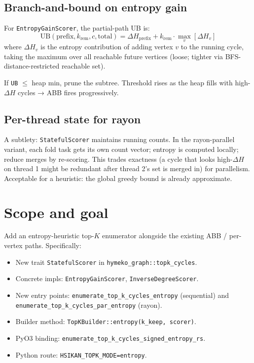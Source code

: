 \documentclass[a4paper,11pt]{article}
\begin{document}
\subsection*{Branch-and-bound on entropy gain}

For \texttt{EntropyGainScorer}, the partial-path UB is:
\[
  \mathrm{UB}(\text{prefix}, k_{\text{rem}}, c, \text{total}) =
  \Delta H_{\text{prefix}} + k_{\text{rem}} \cdot \max_v
  \left[\Delta H_v\right]
\]
where $\Delta H_v$ is the entropy contribution of adding vertex $v$
to the running cycle, taking the maximum over all reachable future
vertices (loose; tighter via BFS-distance-restricted reachable set).

If \texttt{UB} $\le$ heap min, prune the subtree.  Threshold rises
as the heap fills with high-$\Delta H$ cycles → ABB fires
progressively.

\subsection*{Per-thread state for rayon}

A subtlety: \texttt{StatefulScorer} maintains running counts.  In
the rayon-parallel variant, each fold task gets its own count
vector; entropy is computed locally; reduce merges by re-scoring.
This trades exactness (a cycle that looks high-$\Delta H$ on thread
1 might be redundant after thread 2's set is merged in) for
parallelism.  Acceptable for a heuristic: the global greedy bound
is already approximate.

\section*{Scope and goal}

Add an entropy-heuristic top-$K$ enumerator alongside the existing
ABB / per-vertex paths.  Specifically:

\begin{itemize}
  \item New trait \texttt{StatefulScorer} in
    \texttt{hymeko\_graph::topk\_cycles}.
  \item Concrete impls: \texttt{EntropyGainScorer},
    \texttt{InverseDegreeScorer}.
  \item New entry points: \texttt{enumerate\_top\_k\_cycles\_entropy}
    (sequential) and \texttt{enumerate\_top\_k\_cycles\_par\_entropy}
    (rayon).
  \item Builder method: \texttt{TopKBuilder::entropy(k\_keep,
    scorer)}.
  \item PyO3 binding: \texttt{enumerate\_top\_k\_cycles\_signed\_entropy\_rs}.
  \item Python route: \texttt{HSIKAN\_TOPK\_MODE=entropy}.
\end{itemize}
\end{document}
